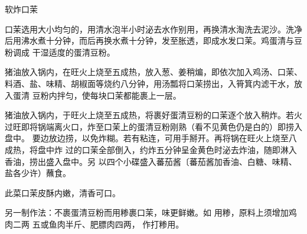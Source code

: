 \begin{recipe}{软炸口茉}

\ingredients


\preparation

\step 口茉选用大小均匀的，用清水泡半小时泌去水作别用，再换清水淘洗去泥沙。洗净
后用沸水煮十分钟，而后再换水煮十分钟，发至胀透，即成水发口茉。鸡蛋清与豆粉调成
干湿适度的蛋清豆粉。

\step 猪油放入锅内，在旺火上烧至五成热，放入葱、姜稍煸，即依次加入鸡汤、口茉、
料酒、盐、味精、胡椒面等烧约八分钟，用汤瓢将口茉捞出，入筲箕内滤干水，放入蛋清
豆粉内拌匀，使每块口茉都能裹上一层。

\step 猪油放入锅内，于旺火上烧至五成热，将裹好蛋清豆粉的口茉逐个放入稍炸。若火
过旺即将锅端离火口，炸至口茉上的蛋清豆粉刚熟（看不见黄色仍是白的）即捞入盘中。
要边放边捞，以免炸糊。若有粘连，可用手掰开。再将锅在旺火上烧至八成热，将盘中炸
过的口茉全部倒入，约炸五分钟呈金黄色时泌去炸油，随即淋入香油，捞出盛入盘中。另
以四个小碟盛入蕃茄酱〔蕃茄酱加香油、白糖、味精、盐各少许）蘸食。

\features

此菜口茉皮酥内嫩，清香可口。

另一制作法：不裹蛋清豆粉而用糁裹口茉，味更鲜嫩。如 用糁，原料上须增加鸡肉二两
五或鱼肉半斤、肥膘肉四两， 作打糁用。

\end{recipe}

